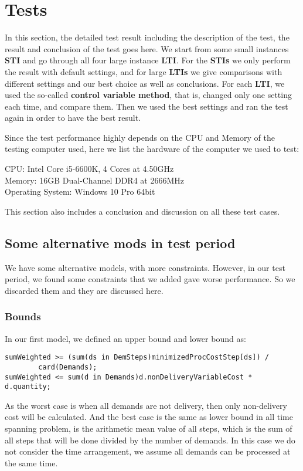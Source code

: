 \documentclass[a4paper, 12pt]{article}
\begin{document}
\section{Tests}

In this section, the detailed test result including the description of the test, the result and conclusion of the test goes here. We start from some small instances \textbf{STI} and go through all four large instance \textbf{LTI}. For the \textbf{STIs} we only perform the result with default settings, and for large \textbf{LTIs} we give comparisons with different settings and our best choice as well as conclusions. For each \textbf{LTI}, we used the so-called \textbf{control variable method}, that is, changed only one setting each time, and compare them. Then we used the best settings and ran the test again in order to have the best result. 

Since the test performance highly depends on the CPU and Memory of the testing computer used, here we list the hardware of the computer we used to test: 

CPU: Intel Core i5-6600K, 4 Cores at 4.50GHz \\
Memory: 16GB Dual-Channel DDR4 at 2666MHz\\
Operating System: Windows 10 Pro 64bit

This section also includes a conclusion and discussion on all these test cases. 

\subsection{Some alternative mods in test period}

We have some alternative models, with more constraints. However, in our test period, we found some constraints that we added gave worse performance. So we discarded them and they are discussed here. 

\subsubsection{Bounds}
In our first model, we defined an upper bound and lower bound as: 
\begin{lstlisting}
sumWeighted >= (sum(ds in DemSteps)minimizedProcCostStep[ds]) / 
        card(Demands);
sumWeighted <= sum(d in Demands)d.nonDeliveryVariableCost * 
d.quantity; 
\end{lstlisting}
As the worst case is when all demands are not delivery, then only non-delivery cost will be calculated. And the best case is the same as lower bound in all time spanning problem, is the arithmetic mean value of all steps, which is the sum of all steps that will be done divided by the number of demands. In this case we do not consider the time arrangement, we assume all demands can be processed at the same time.
\end{document}
